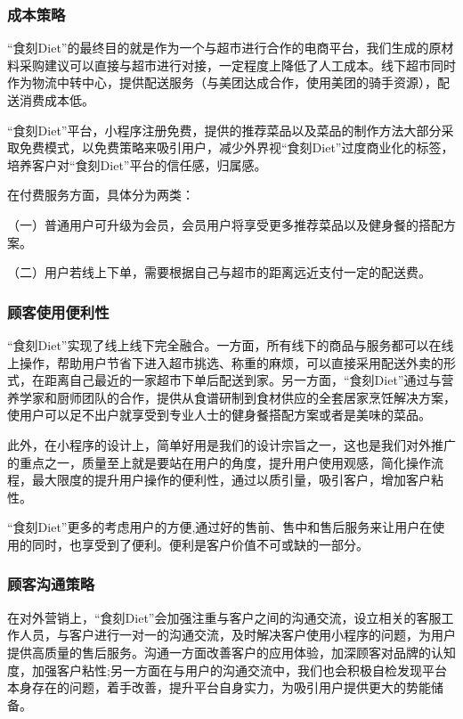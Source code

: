 \documentclass[UTF8,12pt]{ctexart}
\numberwithin{figure}{section}%
\begin{document}
\begin{spacing}{2}
\subsubsection{成本策略}
“食刻Diet”的最终目的就是作为一个与超市进行合作的电商平台，我们生成的原材料采购建议可以直接与超市进行对接，一定程度上降低了人工成本。线下超市同时作为物流中转中心，提供配送服务（与美团达成合作，使用美团的骑手资源），配送消费成本低。

“食刻Diet”平台，小程序注册免费，提供的推荐菜品以及菜品的制作方法大部分采取免费模式，以免费策略来吸引用户，减少外界视“食刻Diet”过度商业化的标签，培养客户对“食刻Diet”平台的信任感，归属感。
 
在付费服务方面，具体分为两类： 

（一）普通用户可升级为会员，会员用户将享受更多推荐菜品以及健身餐的搭配方案。

（二）用户若线上下单，需要根据自己与超市的距离远近支付一定的配送费。

\subsubsection{顾客使用便利性}

“食刻Diet”实现了线上线下完全融合。一方面，所有线下的商品与服务都可以在线上操作，帮助用户节省下进入超市挑选、称重的麻烦，可以直接采用配送外卖的形式，在距离自己最近的一家超市下单后配送到家。另一方面，“食刻Diet”通过与营养学家和厨师团队的合作，提供从食谱研制到食材供应的全套居家烹饪解决方案，使用户可以足不出户就享受到专业人士的健身餐搭配方案或者是美味的菜品。

此外，在小程序的设计上，简单好用是我们的设计宗旨之一，这也是我们对外推广的重点之一，质量至上就是要站在用户的角度，提升用户使用观感，简化操作流程，最大限度的提升用户操作的便利性，通过以质引量，吸引客户，增加客户粘性。

“食刻Diet”更多的考虑用户的方便,通过好的售前、售中和售后服务来让用户在使用的同时，也享受到了便利。便利是客户价值不可或缺的一部分。

\subsubsection{顾客沟通策略}
在对外营销上，“食刻Diet”会加强注重与客户之间的沟通交流，设立相关的客服工作人员，与客户进行一对一的沟通交流，及时解决客户使用小程序的问题，为用户提供高质量的售后服务。沟通一方面改善客户的应用体验，加深顾客对品牌的认知度，加强客户粘性;另一方面在与用户的沟通交流中，我们也会积极自检发现平台本身存在的问题，着手改善，提升平台自身实力，为吸引用户提供更大的势能储备。


\end{spacing}
\end{document}
